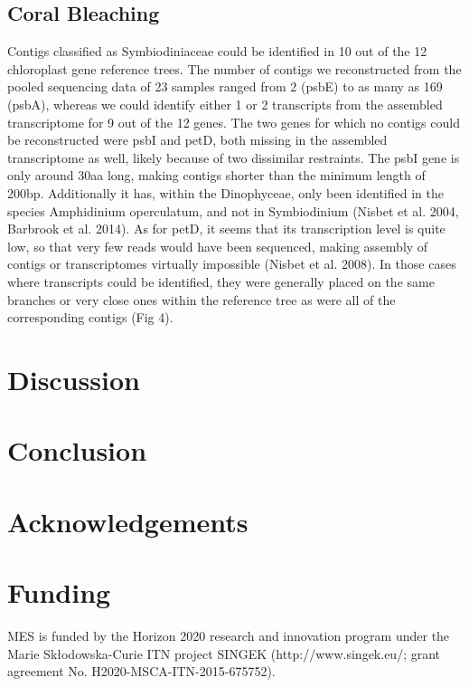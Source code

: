 \documentclass{bioinfo}
\begin{document}
\subsection{Coral Bleaching}
Contigs classified as Symbiodiniaceae could be identified in 10 out of the 12 chloroplast gene reference trees. The number of contigs we reconstructed from the pooled sequencing data of 23 samples ranged from 2 (psbE) to as many as 169 (psbA), whereas we could identify either 1 or 2 transcripts from the assembled transcriptome for 9 out of the 12 genes. The two genes for which no contigs could be reconstructed were psbI and petD, both missing in the assembled transcriptome as well, likely because of two dissimilar restraints. The psbI gene is only around 30aa long, making contigs shorter than the minimum length of 200bp. Additionally it has, within the Dinophyceae, only been identified in the species Amphidinium operculatum, and not in Symbiodinium (Nisbet et al. 2004, Barbrook et al. 2014). As for petD, it seems that its transcription level is quite low, so that very few reads would have been sequenced, making assembly of contigs or transcriptomes virtually impossible (Nisbet et al. 2008). In those cases where transcripts could be identified, they were generally placed on the same branches or very close ones within the reference tree as were all of the corresponding contigs (Fig 4).

\section{Discussion}


\section{Conclusion}


\section*{Acknowledgements}

\section*{Funding}
MES is funded by the Horizon 2020 research and innovation program under the Marie Sk\l{}odowska-Curie ITN project SINGEK (http://www.singek.eu/; grant agreement No. H2020-MSCA-ITN-2015-675752).

%


\end{document}
